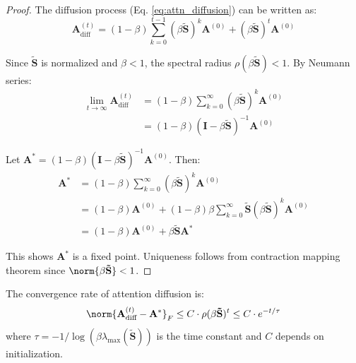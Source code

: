 \documentclass[12pt,en]{elegantpaper}
\begin{document}
\begin{proof}
The diffusion process (Eq. \ref{eq:attn_diffusion}) can be written as:
\begin{equation}
    \mathbf{A}_{\text{diff}}^{(t)} = (1-\beta) \sum_{k=0}^{t-1} (\beta \mathbf{\tilde{S}})^k \mathbf{A}^{(0)} + (\beta \mathbf{\tilde{S}})^t \mathbf{A}^{(0)}
\end{equation}

Since $\mathbf{\tilde{S}}$ is normalized and $\beta < 1$, the spectral radius $\rho(\beta \mathbf{\tilde{S}}) < 1$. By Neumann series:
\begin{align}
    \lim_{t \to \infty} \mathbf{A}_{\text{diff}}^{(t)} &= (1-\beta) \sum_{k=0}^{\infty} (\beta \mathbf{\tilde{S}})^k \mathbf{A}^{(0)} \\
    &= (1-\beta) (\mathbf{I} - \beta \mathbf{\tilde{S}})^{-1} \mathbf{A}^{(0)}
\end{align}

Let $\mathbf{A}^* = (1-\beta) (\mathbf{I} - \beta \mathbf{\tilde{S}})^{-1} \mathbf{A}^{(0)}$. Then:
\begin{align}
    \mathbf{A}^* &= (1-\beta) \sum_{k=0}^{\infty} (\beta \mathbf{\tilde{S}})^k \mathbf{A}^{(0)} \\
    &= (1-\beta) \mathbf{A}^{(0)} + (1-\beta) \beta \sum_{k=0}^{\infty} \mathbf{\tilde{S}} (\beta \mathbf{\tilde{S}})^k \mathbf{A}^{(0)} \\
    &= (1-\beta) \mathbf{A}^{(0)} + \beta \mathbf{\tilde{S}} \mathbf{A}^*
\end{align}

This shows $\mathbf{A}^*$ is a fixed point. Uniqueness follows from contraction mapping theorem since $\norm{\beta \mathbf{\tilde{S}}} < 1$.
\end{proof}

\begin{proposition}
\label{prop:rate}
The convergence rate of attention diffusion is:
\begin{equation}
    \norm{\mathbf{A}_{\text{diff}}^{(t)} - \mathbf{A}^*}_F \leq C \cdot \rho(\beta \mathbf{\tilde{S}})^t \leq C \cdot e^{-t/\tau}
\end{equation}
where $\tau = -1/\log(\beta \lambda_{\max}(\mathbf{\tilde{S}}))$ is the time constant and $C$ depends on initialization.
\end{proposition}
\end{document}
